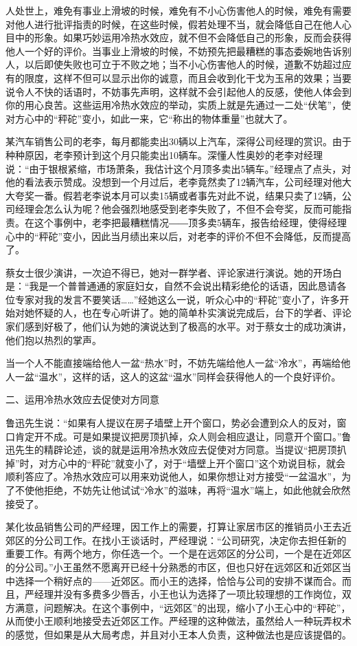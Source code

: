 \documentclass[11pt]{ctexart}
\begin{document}
人处世上，难免有事业上滑坡的时候，难免有不小心伤害他人的时候，难免有需要对他人进行批评指责的时候，在这些时候，假若处理不当，就会降低自己在他人心目中的形象。如果巧妙运用冷热水效应，就不但不会降低自己的形象，反而会获得他人一个好的评价。当事业上滑坡的时候，不妨预先把最糟糕的事态委婉地告诉别人，以后即使失败也可立于不败之地；当不小心伤害他人的时候，道歉不妨超过应有的限度，这样不但可以显示出你的诚意，而且会收到化干戈为玉帛的效果；当要说令人不快的话语时，不妨事先声明，这样就不会引起他人的反感，使他人体会到你的用心良苦。这些运用冷热水效应的举动，实质上就是先通过一二处“伏笔”，使对方心中的“秤砣”变小，如此一来，它“称出的物体重量”也就大了。

某汽车销售公司的老李，每月都能卖出30辆以上汽车，深得公司经理的赏识。由于种种原因，老李预计到这个月只能卖出10辆车。深懂人性奥妙的老李对经理说：“由于银根紧缩，市场萧条，我估计这个月顶多卖出5辆车。”经理点了点头，对他的看法表示赞成。没想到一个月过后，老李竟然卖了12辆汽车，公司经理对他大大夸奖一番。假若老李说本月可以卖15辆或者事先对此不说，结果只卖了12辆，公司经理会怎么认为呢？他会强烈地感受到老李失败了，不但不会夸奖，反而可能指责。在这个事例中，老李把最糟糕情况――顶多卖5辆车，报告给经理，使得经理心中的“秤砣”变小，因此当月绩出来以后，对老李的评价不但不会降低，反而提高了。

蔡女士很少演讲，一次迫不得已，她对一群学者、评论家进行演说。她的开场白是：“我是一个普普通通的家庭妇女，自然不会说出精彩绝伦的话语，因此恳请各位专家对我的发言不要笑话……”经她这么一说，听众心中的“秤砣”变小了，许多开始对她怀疑的人，也在专心听讲了。她的简单朴实演说完成后，台下的学者、评论家们感到好极了，他们认为她的演说达到了极高的水平。对于蔡女士的成功演讲，他们抱以热烈的掌声。

当一个人不能直接端给他人一盆“热水”时，不妨先端给他人一盆“冷水”，再端给他人一盆“温水”，这样的话，这人的这盆“温水”同样会获得他人的一个良好评价。

二、运用冷热水效应去促使对方同意

鲁迅先生说：“如果有人提议在房子墙壁上开个窗口，势必会遭到众人的反对，窗口肯定开不成。可是如果提议把房顶扒掉，众人则会相应退让，同意开个窗口。”鲁迅先生的精辟论述，谈的就是运用冷热水效应去促使对方同意。当提议“把房顶扒掉”时，对方心中的“秤砣”就变小了，对于“墙壁上开个窗口”这个劝说目标，就会顺利答应了。冷热水效应可以用来劝说他人，如果你想让对方接受“一盆温水”，为了不使他拒绝，不妨先让他试试“冷水”的滋味，再将“温水”端上，如此他就会欣然接受了。

某化妆品销售公司的严经理，因工作上的需要，打算让家居市区的推销员小王去近郊区的分公司工作。在找小王谈话时，严经理说：“公司研究，决定你去担任新的重要工作。有两个地方，你任选一个。一个是在远郊区的分公司，一个是在近郊区的分公司。”小王虽然不愿离开已经十分熟悉的市区，但也只好在远郊区和近郊区当中选择一个稍好点的——近郊区。而小王的选择，恰恰与公司的安排不谋而合。而且，严经理并没有多费多少唇舌，小王也认为选择了一项比较理想的工作岗位，双方满意，问题解决。在这个事例中，“远郊区”的出现，缩小了小王心中的“秤砣”，从而使小王顺利地接受去近郊区工作。严经理的这种做法，虽然给人一种玩弄权术的感觉，但如果是从大局考虑，并且对小王本人负责，这种做法也是应该提倡的。
\end{document}
